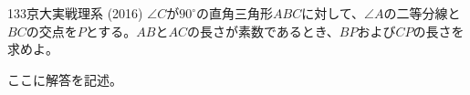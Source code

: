 \begin{thm}{133}{\maru}{京大実戦理系 (2016)}
 $\angle{C}$が$90^\circ$の直角三角形$ABC$に対して、$\angle{A}$の二等分線と$BC$の交点を$P$とする。$AB$と$AC$の長さが素数であるとき、$BP$および$CP$の長さを求めよ。
\end{thm}

ここに解答を記述。